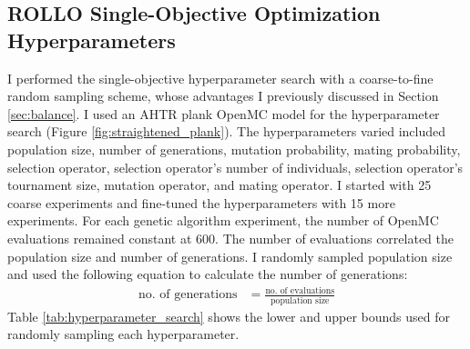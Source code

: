 \subsection{ROLLO Single-Objective Optimization Hyperparameters}
\label{sec:rollo-single-hyp}
I performed the single-objective hyperparameter search with a coarse-to-fine random 
sampling scheme, whose advantages I previously discussed in Section \ref{sec:balance}.
I used an \gls{AHTR} plank OpenMC model for the hyperparameter search (Figure 
\ref{fig:straightened_plank}). 
The hyperparameters varied included population size, number of generations, 
mutation probability, mating probability, selection operator, selection operator's 
number of individuals, selection operator's tournament size, mutation operator, 
and mating operator.  
I started with 25 coarse experiments and fine-tuned the hyperparameters
with 15 more experiments. 
For each genetic algorithm experiment, the number of OpenMC evaluations remained
constant at 600.
The number of evaluations correlated the population size and number of generations. 
I randomly sampled population size and used the following equation to calculate 
the number of generations: 
\begin{align}
    \label{eq:pop_gen}
    \mbox{no. of generations} &= \frac{\mbox{no. of evaluations}}{\mbox{population size} }
\end{align}
Table \ref{tab:hyperparameter_search} shows the lower and upper bounds used 
for randomly sampling each hyperparameter.
